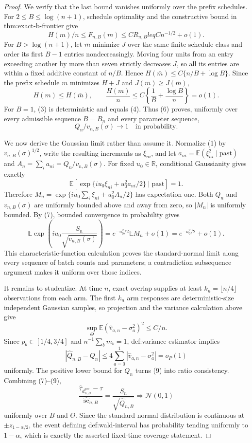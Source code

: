 \documentclass{article}
\begin{document}
\begin{proof}
We verify that the last bound vanishes uniformly over the prefix schedules.  For
\(2\leq B\leq\log(n+1)\), schedule optimality and the constructive bound in thm:exact-b-frontier give
\[
H(m)/n\leq F_{n,B}(m)\leq C R_{n,B}leq Cn^{-1/2}+o(1).
\]
For \(B>\log(n+1)\), let \(\bar m\) minimize \(J\) over the same finite schedule class and order its first \(B-1\) entries nondecreasingly.  Moving four units from an entry exceeding another by more than seven strictly decreases \(J\), so all its entries are within a fixed additive constant of \(n/B\).  Hence
\(H(\bar m)\leq C\{n/B+\log B\}\).  Since the prefix schedule \(m\) minimizes \(H+J\) and \(J(m)\geq J(\bar m)\),
\[
H(m)\leq H(\bar m),
\qquad
\frac{H(m)}n\leq C\left\{\frac1B+\frac{\log B}{n}\right\}=o(1).
\]
For \(B=1\), (3) is deterministic and equals (4).  Thus (6) proves, uniformly over every admissible sequence \(B=B_n\) and every parameter sequence,
\[
Q_n/v_{n,B}(\sigma)\longrightarrow1\quad\text{in probability}. \tag{7}
\]

We now derive the Gaussian limit rather than assume it.  Normalize (1) by
\(v_{n,B}(\sigma)^{1/2}\), write the resulting increments as \(\xi_{ni}\), and let
\(a_{ni}=\mathbb E(\xi_{ni}^2\mid\text{past})\) and
\(A_n=\sum_ia_{ni}=Q_n/v_{n,B}(\sigma)\).  For fixed \(u_0\in\mathbb R\), conditional Gaussianity gives exactly
\[
\mathbb E\!\left[
 \exp\{iu_0\xi_{ni}+u_0^2a_{ni}/2\}\mid\text{past}\right]=1.
\]
Therefore
\(M_n=\exp\{iu_0\sum_i\xi_{ni}+u_0^2A_n/2\}\) has expectation one.  Both
\(Q_n\) and \(v_{n,B}(\sigma)\) are uniformly bounded above and away from zero, so
\(|M_n|\) is uniformly bounded.  By (7), bounded convergence in probability gives
\[
\mathbb E\exp\!\left(iu_0\frac{S_n}{\sqrt{v_{n,B}(\sigma)}}\right)
=e^{-u_0^2/2}\mathbb E M_n+o(1)=e^{-u_0^2/2}+o(1).           \tag{8}
\]
This characteristic-function calculation proves the standard-normal limit along every sequence of batch counts and parameters; a contradiction subsequence argument makes it uniform over those indices.

It remains to studentize.  At time \(n\), exact overlap supplies at least
\(k_n=\lfloor n/4\rfloor\) observations from each arm.  The first \(k_n\) arm responses are deterministic-size independent Gaussian samples, so projection and the variance calculation above give
\[
\sup_\Theta\mathbb E(\widehat v_{a,n}-\sigma_a^2)^2\leq C/n.
\]
Since \(p_b\in[1/4,3/4]\) and \(n^{-1}\sum_bm_b=1\), def:variance-estimator implies
\[
|\widehat Q_{n,B}-Q_n|
\leq4\sum_{a=0}^1|\widehat v_{a,n}-\sigma_a^2|=o_P(1)       \tag{9}
\]
uniformly.  The positive lower bound for \(Q_n\) turns (9) into ratio consistency.  Combining (7)--(9),
\[
\frac{\widehat\tau_{d^{\mathrm{pre}}_{n,B}}-\tau}
 {\widehat{\mathrm{se}}_{n,B}}
=\frac{S_n}{\sqrt{\widehat Q_{n,B}}}
\Longrightarrow\mathcal N(0,1)
\]
uniformly over \(B\) and \(\Theta\).  Since the standard normal distribution is continuous at
\(\pm z_{1-\alpha/2}\), the event defining def:wald-interval has probability tending uniformly to
\(1-\alpha\), which is exactly the asserted fixed-time coverage statement.
\end{proof}
\end{document}
